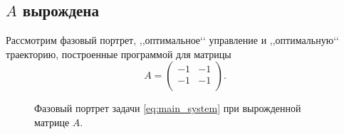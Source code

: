 \subsection{$A$ вырождена}

Рассмотрим фазовый портрет, ,,оптимальное‘‘ управление и ,,оптимальную‘‘ траекторию, построенные программой для матрицы
$$
        A =
        \begin{pmatrix}
        -1 & -1 \\
        -1 & -1 \\
        \end{pmatrix}.
$$
\begin{figure}[h]
\noindent{}
\caption{Фазовый портрет задачи \eqref{eq:main_system} при вырожденной матрице $A$.}
\end{figure}

